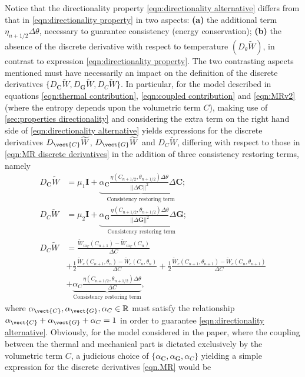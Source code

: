 {{Notice that the directionality property \eqref{eqn:directionality alternative} differs from that in \eqref{eqn:directionality property} in two aspects: \textbf{(a)} the additional term $\eta_{n+1/2}\Delta \theta$, necessary to guarantee consistency (energy conservation); \textbf{(b)} the absence of the discrete derivative with respect to temperature $(D_{\theta}\widetilde{W})$, in contrast to expression \eqref{eqn:directionality property}.
The two contrasting aspects mentioned must have necessarily an impact on the definition of the discrete derivatives $\{D_{\boldsymbol{C}}\widetilde{W},D_{\boldsymbol{G}}\widetilde{W},D_{{C}}\widetilde{W}\}$.
In particular, for the model described in equations \eqref{eqn:thermal contribution}, \eqref{eqn:coupled contribution} and \eqref{eqn:MRv2} (where the entropy depends upon the volumetric term $C$), making use of \ref{sec:properties directionality} and considering the extra term on the right hand side of \eqref{eqn:directionality alternative} yields expressions for the discrete derivatives $D_{\vect{C}}\widetilde{W}$, $D_{\vect{G}}\widetilde{W}$ and $D_{{C}}\widetilde{W}$, differing with respect to those in \eqref{eqn:MR discrete derivatives} in the addition of three consistency restoring terms, namely
%
\begin{equation}\label{eqn.MR}
\begin{aligned}
D_{\boldsymbol{C}}\widetilde{W}&=\mu_1\boldsymbol{I} + \underbrace{\alpha_{\boldsymbol{C}}\frac{\eta({C}_{n+1/2},\theta_{n+1/2})\Delta \theta}{\vert\vert\Delta\boldsymbol{C}\vert\vert^2}\Delta\boldsymbol{C}}_{\text{Consistency restoring term}};\\
%
D_{C}\widetilde{W}&=\mu_2\boldsymbol{I} + \underbrace{\alpha_{\boldsymbol{G}}\frac{\eta({C}_{n+1/2},\theta_{n+1/2})\Delta \theta}{\vert\vert\Delta\boldsymbol{G}\vert\vert^2}\Delta\boldsymbol{G}}_{\text{Consistency restoring term}};\\
%
D_{C}\widetilde{W}&=\frac{\widetilde{W}_{m_C}(C_{n+1})-\widetilde{W}_{m_C}(C_{n})}{\Delta C}\\&+ \frac{1}{2}\frac{\widetilde{W}_c(C_{n+1},\theta_n)-\widetilde{W}_c(C_{n},\theta_n)}{\Delta C} + \frac{1}{2}\frac{\widetilde{W}_c(C_{n+1},\theta_{n+1})-\widetilde{W}_c(C_{n},\theta_{n+1})}{\Delta C} \\&+ 
\underbrace{\alpha_{{C}}\frac{\eta({C}_{n+1/2},\theta_{n+1/2})\Delta \theta}{\Delta{C}}}_{\text{Consistency restoring term}},
\end{aligned}
\end{equation}
%
where $\alpha_{\vect{C}},\alpha_{\vect{G}},\alpha_{{C}}\in\mathbb{R}$ must satisfy the relationship $\alpha_{\vect{C}}+\alpha_{\vect{G}} + \alpha_{{C}} = 1$ in order to guarantee \eqref{eqn:directionality alternative}. Obviously, for the model considered in the paper, where the coupling between the thermal and mechanical part is dictated exclusively by the volumetric term $C$, a judicious choice of $\{\alpha_{\boldsymbol{C}},\alpha_{\boldsymbol{G}},\alpha_C\}$ yielding a simple expression for the discrete derivatives \eqref{eqn.MR} would be 
}}
